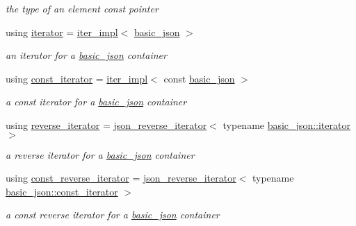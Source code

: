 \begin{DoxyCompactItemize}
\begin{DoxyCompactList}\small\item\em the type of an element const pointer \end{DoxyCompactList}\item 
\mbox{\label{classnlohmann_1_1basic__json_aa549b2b382916b3baafb526e5cb410bd}} 
using \hyperlink{classnlohmann_1_1basic__json_aa549b2b382916b3baafb526e5cb410bd}{iterator} = \hyperlink{classnlohmann_1_1detail_1_1iter__impl}{iter\+\_\+impl}$<$ \hyperlink{classnlohmann_1_1basic__json}{basic\+\_\+json} $>$
\begin{DoxyCompactList}\small\item\em an iterator for a \hyperlink{classnlohmann_1_1basic__json}{basic\+\_\+json} container \end{DoxyCompactList}\item 
\mbox{\label{classnlohmann_1_1basic__json_aebd2cfa7e4ded4e97cde9269bfeeea38}} 
using \hyperlink{classnlohmann_1_1basic__json_aebd2cfa7e4ded4e97cde9269bfeeea38}{const\+\_\+iterator} = \hyperlink{classnlohmann_1_1detail_1_1iter__impl}{iter\+\_\+impl}$<$ const \hyperlink{classnlohmann_1_1basic__json}{basic\+\_\+json} $>$
\begin{DoxyCompactList}\small\item\em a const iterator for a \hyperlink{classnlohmann_1_1basic__json}{basic\+\_\+json} container \end{DoxyCompactList}\item 
\mbox{\label{classnlohmann_1_1basic__json_a5b8c0ebedd920b507f4f7ff4e19bf3c6}} 
using \hyperlink{classnlohmann_1_1basic__json_a5b8c0ebedd920b507f4f7ff4e19bf3c6}{reverse\+\_\+iterator} = \hyperlink{classnlohmann_1_1detail_1_1json__reverse__iterator}{json\+\_\+reverse\+\_\+iterator}$<$ typename \hyperlink{classnlohmann_1_1basic__json_aa549b2b382916b3baafb526e5cb410bd}{basic\+\_\+json\+::iterator} $>$
\begin{DoxyCompactList}\small\item\em a reverse iterator for a \hyperlink{classnlohmann_1_1basic__json}{basic\+\_\+json} container \end{DoxyCompactList}\item 
\mbox{\label{classnlohmann_1_1basic__json_aa7dba16ed9ee97380aeb17a207dd919a}} 
using \hyperlink{classnlohmann_1_1basic__json_aa7dba16ed9ee97380aeb17a207dd919a}{const\+\_\+reverse\+\_\+iterator} = \hyperlink{classnlohmann_1_1detail_1_1json__reverse__iterator}{json\+\_\+reverse\+\_\+iterator}$<$ typename \hyperlink{classnlohmann_1_1basic__json_aebd2cfa7e4ded4e97cde9269bfeeea38}{basic\+\_\+json\+::const\+\_\+iterator} $>$
\begin{DoxyCompactList}\small\item\em a const reverse iterator for a \hyperlink{classnlohmann_1_1basic__json}{basic\+\_\+json} container \end{DoxyCompactList}\end{DoxyCompactItemize}
